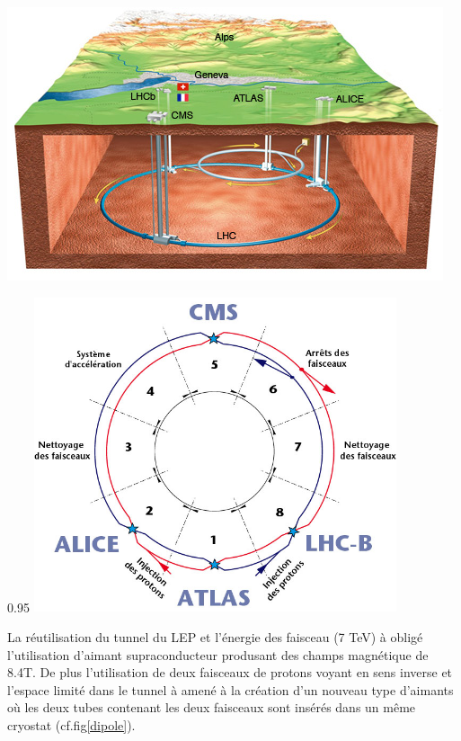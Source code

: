 \begin{minipagewithmarginpars}[h]{\textwidth}
  	\centering
	\includegraphics[scale=0.75]{LHC/CERNMap.jpg}
  	\label{lhcschema}	
\end{minipagewithmarginpars}

\begin{minipagewithmarginpars}[h]{0.95\textwidth}
  	\centering
	\includegraphics[width=0.80\textwidth]{LHC/lhc-schematic.jpg}
  	\label{octants}	
\end{minipagewithmarginpars}

La réutilisation du tunnel du LEP et l'énergie des faisceau (7 TeV) à obligé l'utilisation d'aimant supraconducteur produsant des champs magnétique de 8.4T. De plus l'utilisation de deux faisceaux de protons voyant en sens inverse et l'espace limité dans le tunnel à amené à la création d'un nouveau type d'aimants où les deux tubes contenant les deux faisceaux sont insérés dans un même cryostat (cf.fig\ref{dipole}).

